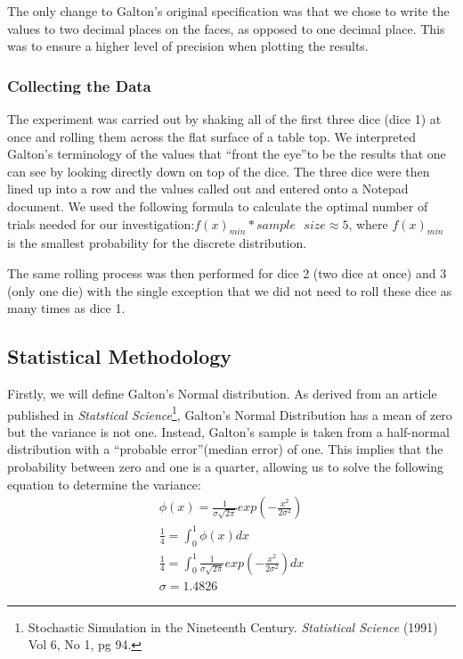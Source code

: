 The only change to Galton's original specification was that we chose to write the values to two decimal places on the faces, as opposed to one decimal place. This was to ensure a higher level of precision when plotting the results. 

\subsubsection*{Collecting the Data}
The experiment was carried out by shaking all of the first three dice (dice 1) at once and rolling them across the flat surface of a table top. We interpreted Galton's terminology of the values that \textquotedblleft front the eye\textquotedblright to be the results that one can see by looking directly down on top of the dice. The three dice were then lined up into a row and the values called out and entered onto a Notepad document. We used the following formula to calculate the optimal number of trials needed for our investigation:$f(x)_{min}*sample\textrm{ }size\approx 5 $, where $f(x)_{min}$ is the smallest probability for the discrete distribution. 

The same rolling process was then performed for dice 2 (two dice at once) and 3 (only one die) with the single exception that we did not need to roll these dice as many times as dice 1. 


 
\subsection{Statistical Methodology}
Firstly, we will define Galton's Normal distribution. As derived from an article published in \textit{Statstical Science}\footnote[1]{Stochastic Simulation in the Nineteenth Century. {\it Statistical Science} (1991) Vol 6, No 1, pg 94.}, Galton's Normal Distribution has a mean of zero but the variance is not one. Instead, Galton's sample is taken from a half-normal distribution with a \textquotedblleft probable error\textquotedblright (median error) of one. This implies that the probability between zero and one is a quarter, allowing us to solve the following equation to determine the variance: 
\begin{displaymath}
\begin{array}{l}
\phi(x)=\frac{1}{\sigma\sqrt{2\pi}}exp(-\frac{x^2}{2\sigma^2})\\
\frac{1}{4}=\int_0^1\phi(x)dx\\
\frac{1}{4}=\int_0^1\frac{1}{\sigma\sqrt{2\pi}}exp(-\frac{x^2}{2\sigma^2})dx\\
\sigma=1.4826
\end{array}
\end{displaymath}

